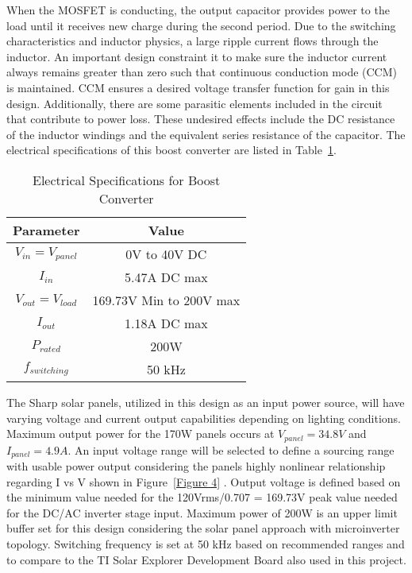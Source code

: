 When the MOSFET is conducting, the output capacitor provides power to the load until it receives new charge during the second period. Due to the switching characteristics and inductor physics, a large ripple current flows through the inductor. An important design constraint it to make sure the inductor current always remains greater than zero such that continuous conduction mode (CCM) is maintained. CCM ensures a desired voltage transfer function for gain in this design. Additionally, there are some parasitic elements included in the circuit that contribute to power loss. These undesired effects include the DC resistance of the inductor windings and the equivalent series resistance of the capacitor.  
The electrical specifications of this boost converter are listed in Table~\ref{Table 1}. \\ 

\begin{table}
\centering
\begin{tabular}{|c|c|}
\hline
 Parameter & Value \\
 \hline
 $ V_{in} = V_{panel}$ & 0V to 40V DC \\
 \hline
 $ I_{in}$ & 5.47A DC max \\
 \hline
 $ V_{out}=V_{load} $ & 169.73V Min to 200V max \\
 \hline
 $ I_{out} $ & 1.18A DC max \\
 \hline
 $ P_{rated} $ & 200W \\
 \hline
 $ f_{switching} $ & 50 kHz \\
 \hline
\end{tabular}
\caption{Electrical Specifications for Boost Converter}
\label{Table 1}
\end{table}

The Sharp solar panels, utilized in this design as an input power source,  will have varying voltage and current output capabilities depending on lighting conditions. Maximum output power for the 170W panels occurs at $V_{panel}=34.8V$ and  $I_{panel} = 4.9A$. An input voltage range will be selected to define a sourcing range with usable power output considering the panels highly nonlinear relationship regarding I vs V shown  in Figure~\ref{Figure 4} . Output voltage is defined based on the minimum value needed for the 120Vrms/0.707 = 169.73V  peak value needed for the DC/AC inverter stage input. Maximum power of 200W is an upper limit buffer set for this design considering the solar panel approach with microinverter topology. Switching frequency is set at 50 kHz based on recommended ranges and to compare to the TI Solar Explorer Development Board also used in this project.\cite{SharpPanel}

